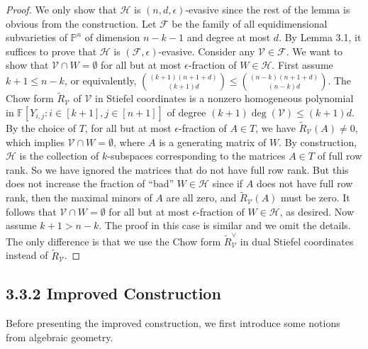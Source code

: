 \documentclass[10pt,a4paper]{article}
\newcommand{\FF}{\mathbb F}
\newcommand{\PP}{\mathbb P}
\begin{document}
\begin{proof}
We only show that $\mathcal H$ is $(n,d,\epsilon)$-evasive since the rest of the lemma is obvious from the construction. Let $\mathcal F$ be the family of all equidimensional subvarieties of $\PP^n$ of dimension $n-k-1$ and degree at most $d$. By Lemma 3.1, it suffices to prove that $\mathcal H$ is $(\mathcal F,\epsilon)$-evasive. Consider any $\mathcal V\in\mathcal F$. We want to show that $\mathcal V\cap W=\emptyset$ for all but at most $\epsilon$-fraction of $W\in\mathcal H$.
First assume $k+1\le n-k$, or equivalently, $\binom{(k+1)(n+1+d)}{(k+1)d}\le\binom{(n-k)(n+1+d)}{(n-k)d}$. The Chow form $\widetilde R_{\mathcal V}$ of $\mathcal V$ in Stiefel coordinates is a nonzero homogeneous polynomial in $\FF[Y_{i,j}:i\in[k+1],j\in[n+1]]$ of degree $(k+1)\deg(\mathcal V)\le(k+1)d$. By the choice of $T$, for all but at most $\epsilon$-fraction of $A\in T$, we have $\widetilde R_{\mathcal V}(A)\ne0$, which implies $\mathcal V\cap W=\emptyset$, where $A$ is a generating matrix of $W$.
By construction, $\mathcal H$ is the collection of $k$-subspaces corresponding to the matrices $A\in T$ of full row rank. So we have ignored the matrices that do not have full row rank. But this does not increase the fraction of ``bad'' $W\in\mathcal H$ since if $A$ does not have full row rank, then the maximal minors of $A$ are all zero, and $\widetilde R_{\mathcal V}(A)$ must be zero. It follows that $\mathcal V\cap W=\emptyset$ for all but at most $\epsilon$-fraction of $W\in\mathcal H$, as desired.
Now assume $k+1>n-k$. The proof in this case is similar and we omit the details. The only difference is that we use the Chow form $\widetilde R^\vee_{\mathcal V}$ in dual Stiefel coordinates instead of $\widetilde R_{\mathcal V}$.
\end{proof}
\subsection*{3.3.2 Improved Construction}
Before presenting the improved construction, we first introduce some notions from algebraic geometry.
\end{document}
